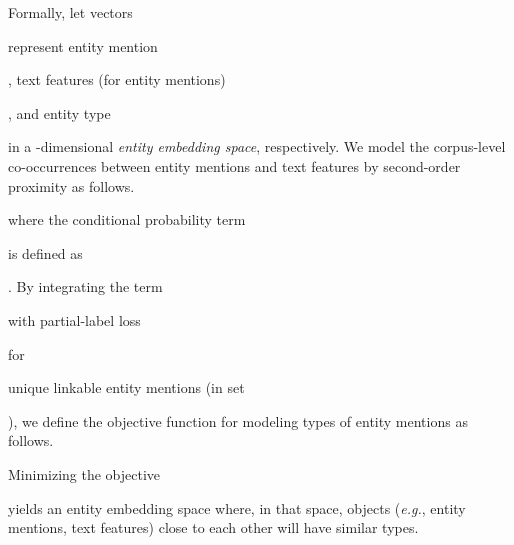 \documentclass[letterpaper]{sig-alternate-2013}
\def\eg{{\sl e.g.}}
\begin{document}
Formally, let vectors \begin{small}\end{small} represent entity mention \begin{small}\end{small}, text features (for entity mentions) \begin{small}\end{small}, and entity type \begin{small}\end{small} in a -dimensional \textit{entity embedding space}, respectively. We model the corpus-level co-occurrences between entity mentions and text features by second-order proximity as follows.

where the conditional probability term \begin{small}\end{small} is defined as \begin{small}\end{small}.
By integrating the term \begin{small}\end{small} with partial-label loss \begin{small}\end{small} for \begin{small}\end{small} unique linkable entity mentions (in set \begin{small}\end{small}), we define the objective function for modeling types of entity mentions as follows.

Minimizing the objective \begin{small}\end{small} yields an entity embedding space where, in that space, objects (\eg, entity mentions, text features) close to each other will have similar types.
 
\end{document}
